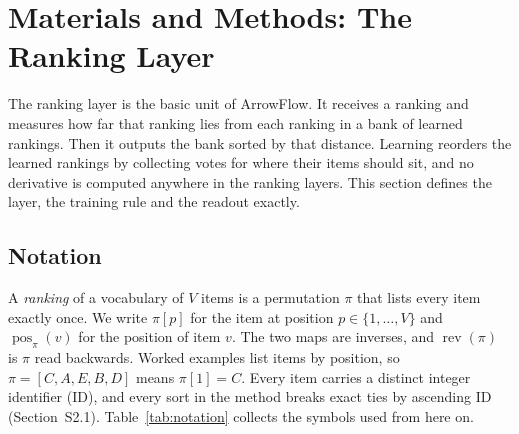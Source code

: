 \section{Materials and Methods: The Ranking Layer}\label{sec:ranking-layer}

The ranking layer is the basic unit of ArrowFlow. It receives a ranking and measures how far that ranking lies from each ranking in a bank of learned rankings. Then it outputs the bank sorted by that distance. Learning reorders the learned rankings by collecting votes for where their items should sit, and no derivative is computed anywhere in the ranking layers. This section defines the layer, the training rule and the readout exactly.

\subsection{Notation}\label{sec:notation}

A \emph{ranking} of a vocabulary of $V$ items is a permutation $\pi$ that lists every item exactly once. We write $\pi[p]$ for the item at position $p\in\{1,\dots,V\}$ and $\operatorname{pos}_\pi(v)$ for the position of item $v$. The two maps are inverses, and $\operatorname{rev}(\pi)$ is $\pi$ read backwards. Worked examples list items by position, so $\pi=[C,A,E,B,D]$ means $\pi[1]=C$. Every item carries a distinct integer identifier (ID), and every sort in the method breaks exact ties by ascending ID (Section~S2.1). Table~\ref{tab:notation} collects the symbols used from here on.

